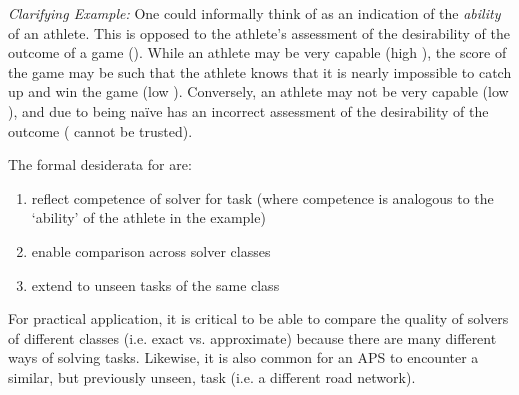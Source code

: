     \emph{Clarifying Example:} One could informally think of \xQ{} as an indication of the \emph{ability} of an athlete. This is opposed to the athlete's assessment of the desirability of the outcome of a game (\xO). While an athlete may be very capable (high \xQ), the score of the game may be such that the athlete knows that it is nearly impossible to catch up and win the game (low \xO). Conversely, an athlete may not be very capable (low \xQ), and due to being na\"{i}ve has an incorrect assessment of the desirability of the outcome (\xO{} cannot be trusted).
    
    The formal desiderata for \xQ{} are:
    
    \begin{enumerate}[label=\textbf{D\arabic*}]
        \item reflect competence of solver \solve{} for task \task{} (where competence is analogous to the `ability' of the athlete in the example)\label{itm:d1}
        \item enable comparison across solver classes \label{itm:d2}
        \item extend to unseen tasks of the same class \taskclass \label{itm:d3}
    \end{enumerate}
    
    For practical application, it is critical to be able to compare the quality of solvers of different classes (i.e. exact vs. approximate) because there are many different ways of solving tasks. Likewise, it is also common for an APS to encounter a similar, but previously unseen, task (i.e. a different road network).
    
